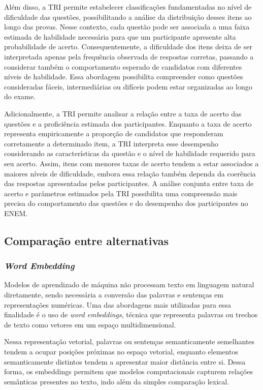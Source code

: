 \documentclass[a4paper,10pt, twocolumn]{article}
\begin{document}
Além disso, a TRI permite estabelecer classificações fundamentadas no nível de dificuldade das questões, possibilitando a análise da distribuição desses itens ao longo das provas. Nesse contexto, cada questão pode ser associada a uma faixa estimada de habilidade necessária para que um participante apresente alta probabilidade de acerto. Consequentemente, a dificuldade dos itens deixa de ser interpretada apenas pela frequência observada de respostas corretas, passando a considerar também o comportamento esperado de candidatos com diferentes níveis de habilidade. Essa abordagem possibilita compreender como questões consideradas fáceis, intermediárias ou difíceis podem estar organizadas ao longo do exame.

Adicionalmente, a TRI permite analisar a relação entre a taxa de acerto das questões e a proficiência estimada dos participantes. Enquanto a taxa de acerto representa empiricamente a proporção de candidatos que responderam corretamente a determinado item, a TRI interpreta esse desempenho considerando as características da questão e o nível de habilidade requerido para seu acerto. Assim, itens com menores taxas de acerto tendem a estar associados a maiores níveis de dificuldade, embora essa relação também dependa da coerência das respostas apresentadas pelos participantes. A análise conjunta entre taxa de acerto e parâmetros estimados pela TRI possibilita uma compreensão mais precisa do comportamento das questões e do desempenho dos participantes no ENEM.

\subsection{Comparação entre alternativas}
\subsubsection{\textit{Word Embedding}}
Modelos de aprendizado de máquina não processam texto em linguagem natural diretamente, sendo necessária a conversão das palavras e sentenças em representações numéricas. Uma das abordagens mais utilizadas para essa finalidade é o uso de \textit{word embeddings}, técnica que representa palavras ou trechos de texto como vetores em um espaço multidimensional. \cite{jm3}

Nessa representação vetorial, palavras ou sentenças semanticamente semelhantes tendem a ocupar posições próximas no espaço vetorial, enquanto elementos semanticamente distintos tendem a apresentar maior distância entre si. Dessa forma, os embeddings permitem que modelos computacionais capturem relações semânticas presentes no texto, indo além da simples comparação lexical. \cite{jm3}
\end{document}
